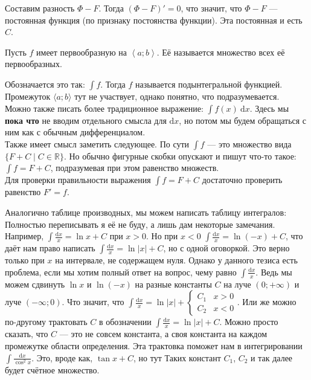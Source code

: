 \documentclass{article}
\newcommand*{\ab}[1][a;b]{{\left\langle #1\right\rangle}}
\begin{document}
\begin{itemize}
        \begin{Proof}
            Составим разность $\Phi-F$. Тогда $(\Phi-F)'=0$, что значит, что $\Phi-F$ --- постоянная функция (по признаку постоянства функции). Эта постоянная и есть $C$.
        \end{Proof}
        \dfn Пусть $f$ имеет первообразную на $\ab$. Её  называется множество всех её первообразных.
        \begin{Comment}
            Обозначается это так: $\int f$. Тогда $f$ называется подынтегральной функцией. Промежуток $\langle a;b\rangle$ тут не участвует, однако понятно, что подразумевается.\\
            Можно также писать более традиционное выражение: $\int f(x)~\mathrm dx$. Здесь мы \textbf{пока что} не вводим отдельного смысла для $\mathrm dx$, но потом мы будем обращаться с ним как с обычным дифференциалом.\\
            Также имеет смысл заметить следующее. По сути $\int f$ --- это множество вида $\{F+C\mid C\in\mathbb R\}$. Но обычно фигурные скобки опускают и пишут что-то такое: $\int f=F+C$, подразумевая при этом равенство множеств.\\
            Для проверки правильности выражения $\int f=F+C$ достаточно проверить равенство $F'=f$.
        \end{Comment}
        \begin{Comment}
           Аналогично таблице производных, мы можем написать таблицу интегралов:
           Полностью переписывать я её не буду, а лишь дам некоторые замечания.\\
           Например, $\int\frac{\mathrm dx}x=\ln x+C$ при $x>0$. Но при $x<0$ $\int\frac{\mathrm dx}x=\ln(-x)+C$, что даёт нам право написать $\int\frac{\mathrm dx}x=\ln|x|+C$, но с одной оговоркой. Это верно только при $x$ на интервале, не содержащем нуля. Однако у данного тезиса есть проблема, если мы хотим полный ответ на вопрос, чему равно $\int\frac{\mathrm dx}x$. Ведь мы можем сдвинуть $\ln x$ и $\ln(-x)$ на разные константы $C$ на луче $(0;+\infty)$ и луче $(-\infty;0)$. Что значит, что $\int\frac{\mathrm dx}x=\ln|x|+\begin{cases}
               C_1 & x>0\\
               C_2 & x<0
           \end{cases}$. Или же можно по-другому трактовать $C$ в обозначении $\int\frac{\mathrm dx}x=\ln|x|+C$. Можно просто сказать, что $C$ — это не совсем константа, а своя константа на каждом промежутке области определения. Эта трактовка поможет нам в интегрировании $\int\frac{\mathrm dx}{\cos^2x}$. Это, вроде как, $\tan x+C$, но тут Таких констант $C_1$, $C_2$ и так далее будет счётное множество.\\

\end{Comment}
\end{itemize}
\end{document}
